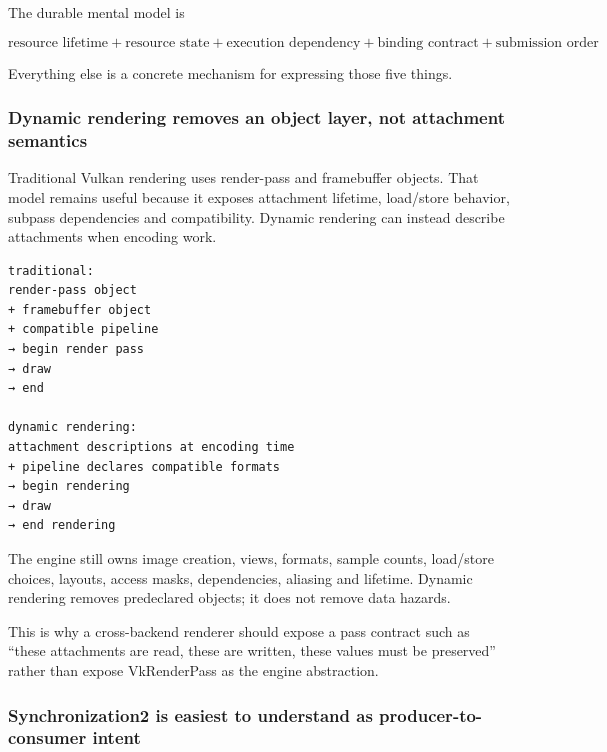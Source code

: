 The durable mental model is

\[
\boxed{
\text{resource lifetime}
+
\text{resource state}
+
\text{execution dependency}
+
\text{binding contract}
+
\text{submission order}
}
\]

Everything else is a concrete mechanism for expressing those five things.

\subsubsection{Dynamic rendering removes an object layer, not attachment semantics}\label{05-engine-i-ch023-dynamic-rendering-removes-an-object-layer-not-attachment-semantics}

\hypertarget{05-engine-i-ch023-dynamic-rendering-removes-an-object-layer-not-attachment-semantics}{}

Traditional Vulkan rendering uses render-pass and framebuffer objects. That model remains useful because it exposes attachment lifetime, load/store behavior, subpass dependencies and compatibility. Dynamic rendering can instead describe attachments when encoding work.

\begin{verbatim}
traditional:
render-pass object
+ framebuffer object
+ compatible pipeline
→ begin render pass
→ draw
→ end

dynamic rendering:
attachment descriptions at encoding time
+ pipeline declares compatible formats
→ begin rendering
→ draw
→ end rendering
\end{verbatim}

The engine still owns image creation, views, formats, sample counts, load/store choices, layouts, access masks, dependencies, aliasing and lifetime. Dynamic rendering removes predeclared objects; it does not remove data hazards.

This is why a cross-backend renderer should expose a pass contract such as ``these attachments are read, these are written, these values must be preserved'' rather than expose VkRenderPass as the engine abstraction.

\subsubsection{Synchronization2 is easiest to understand as producer-to-consumer intent}\label{05-engine-i-ch023-synchronization2-is-easiest-to-understand-as-producer-to-consumer-intent}

\hypertarget{05-engine-i-ch023-synchronization2-is-easiest-to-understand-as-producer-to-consumer-intent}{}

